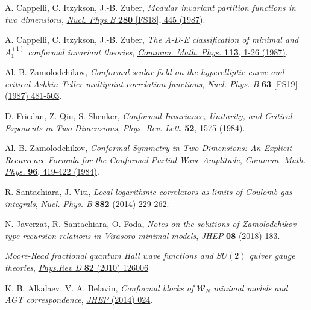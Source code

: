 \documentclass[a4paper,11pt]{article}
\begin{document}
\begin{thebibliography}{99}
 A. Cappelli, C. Itzykson, J.-B. Zuber, \emph{Modular invariant partition functions in two dimensions}, 
\href{https://doi.org/10.1016/0550-3213(87)90155-6}{\emph{Nucl. Phys.B} {\bf 280} [FS18], 445 (1987)}.

 A. Cappelli, C. Itzykson, J.-B. Zuber, \emph{The A-D-E classification of minimal and $A_1^{(1)}$ conformal invariant theories}, \href{https://doi.org/10.1007/BF01221394}{\emph{Commun. Math. Phys.} {\bf 113}, 1-26 (1987)}.



 Al. B. Zamolodchikov, \emph{Conformal scalar field on the hyperelliptic curve and critical Ashkin-Teller multipoint correlation functions}, \href{https://doi.org/10.1016/0550-3213(87)90350-6}{\emph{Nucl. Phys. B} {\bf 63} [FS19] (1987) 481-503}.



 D. Friedan, Z. Qiu, S. Shenker, \emph{Conformal Invariance, Unitarity, and Critical Exponents in Two Dimensions}, \href{https://doi.org/10.1103/PhysRevLett.52.1575}{\emph{Phys. Rev. Lett}. {\bf 52}, 1575 (1984)}.





 Al.  B.  Zamolodchikov, \emph{Conformal  Symmetry  in  Two  Dimensions: An  Explicit  Recurrence Formula for the  Conformal Partial  Wave  Amplitude}, \href{https://doi.org/10.1007/BF01214585}{\emph{Commun. Math. Phys.} {\bf 96},  419-422  (1984)}.

 R. Santachiara, J. Viti, \emph{Local logarithmic correlators as limits of Coulomb gas integrals},
\href{https://doi.org/10.1016/j.nuclphysb.2014.02.022}{\emph{Nucl. Phys. B} {\bf 882} (2014) 229-262}.

 N. Javerzat, R. Santachiara, O. Foda, \emph{Notes on the solutions of Zamolodchikov-type recursion relations in Virasoro minimal models}, \href{https://doi.org/10.1007/JHEP08(2018)183}{\emph{JHEP} {\bf 08} (2018) 183}.

 \emph{Moore-Read fractional quantum Hall wave functions and $SU(2)$ quiver gauge theories}, \href{https://link.aps.org/doi/10.1103/PhysRevD.82.126006}{\emph{Phys.Rev D} {\bf 82} (2010) 126006}

 K. B. Alkalaev, V. A. Belavin, \emph{Conformal blocks of $\mathcal{W}_N$
minimal models and AGT correspondence}, \href{https://doi.org/10.1007/JHEP07(2014)024}{\emph{JHEP} (2014) 024}.




\end{thebibliography}
\end{document}
